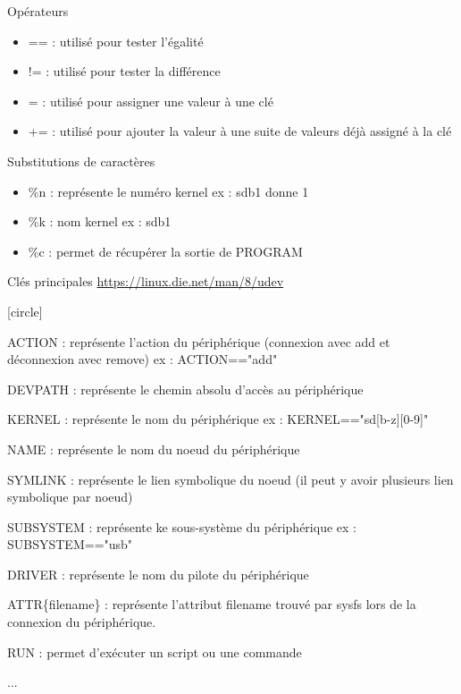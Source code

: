 \documentclass{beamer}
\begin{document}
\begin{frame}
\begin{block}{Opérateurs} 
	
	\begin{itemize}
		
		[circle]
		\item == : utilisé pour tester l'égalité
		\item != : utilisé pour tester la différence
		\item = : utilisé pour assigner une valeur à une clé
		\item += : utilisé pour ajouter la valeur à une suite de valeurs déjà assigné à la clé
	\end{itemize}
\end{block}

\begin{block}{Substitutions de caractères} 
	
	\begin{itemize}
		
		[circle]
		\item \%n : représente le numéro kernel ex : sdb1 donne 1
		\item \%k : nom kernel ex : sdb1 
		\item \%c : permet de récupérer la sortie de PROGRAM
	\end{itemize}
\end{block}

\end{frame}
\begin{frame}
\begin{block}{Clés principales \url{https://linux.die.net/man/8/udev}} 
	
	\begin{itemize}
		
		[circle]
		\footnotesize{
		\item ACTION : représente l'action du périphérique (connexion avec add et déconnexion avec remove) ex : ACTION=="add"
		\item DEVPATH : représente le chemin absolu d'accès au périphérique
		\item KERNEL : représente le nom du périphérique ex : KERNEL=="sd[b-z][0-9]"
		\item NAME : représente le nom du noeud du périphérique
		\item SYMLINK : représente le lien symbolique du noeud (il peut y avoir plusieurs lien symbolique par noeud)
		\item SUBSYSTEM : représente ke sous-système du périphérique ex : SUBSYSTEM=="usb"
		\item DRIVER : représente le nom du pilote du périphérique
		\item ATTR\{filename\} : représente l'attribut filename trouvé par sysfs lors de la connexion du périphérique.
		\item RUN : permet d'exécuter un script ou une commande
		\item ...
		
	}
	\end{itemize}
\end{block}
\end{frame}
\end{document}
